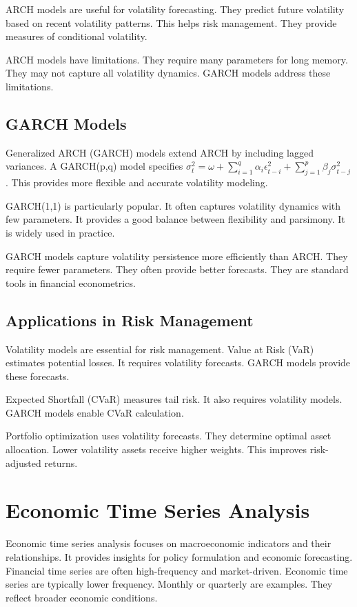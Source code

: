 ARCH models are useful for volatility forecasting. They predict future volatility based on recent volatility patterns. This helps risk management. They provide measures of conditional volatility.

ARCH models have limitations. They require many parameters for long memory. They may not capture all volatility dynamics. GARCH models address these limitations.

\subsection{GARCH Models}

Generalized ARCH (GARCH) models extend ARCH by including lagged variances. A GARCH(p,q) model specifies \(\sigma_t^2 = \omega + \sum_{i=1}^{q} \alpha_i \epsilon_{t-i}^2 + \sum_{j=1}^{p} \beta_j \sigma_{t-j}^2\). This provides more flexible and accurate volatility modeling.

GARCH(1,1) is particularly popular. It often captures volatility dynamics with few parameters. It provides a good balance between flexibility and parsimony. It is widely used in practice.

GARCH models capture volatility persistence more efficiently than ARCH. They require fewer parameters. They often provide better forecasts. They are standard tools in financial econometrics.

\subsection{Applications in Risk Management}

Volatility models are essential for risk management. Value at Risk (VaR) estimates potential losses. It requires volatility forecasts. GARCH models provide these forecasts.

Expected Shortfall (CVaR) measures tail risk. It also requires volatility models. GARCH models enable CVaR calculation.

Portfolio optimization uses volatility forecasts. They determine optimal asset allocation. Lower volatility assets receive higher weights. This improves risk-adjusted returns.

\section{Economic Time Series Analysis}

Economic time series analysis focuses on macroeconomic indicators and their relationships. It provides insights for policy formulation and economic forecasting. Financial time series are often high-frequency and market-driven. Economic time series are typically lower frequency. Monthly or quarterly are examples. They reflect broader economic conditions.

